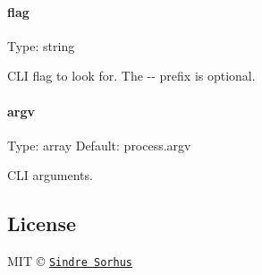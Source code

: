 \paragraph*{flag}

Type\+: {\ttfamily string}

C\+L\+I flag to look for. The {\ttfamily -\/-\/} prefix is optional.

\paragraph*{argv}

Type\+: {\ttfamily array} Default\+: {\ttfamily process.\+argv}

C\+L\+I arguments.

\subsection*{License}

M\+I\+T © \href{http://sindresorhus.com}{\tt Sindre Sorhus} 